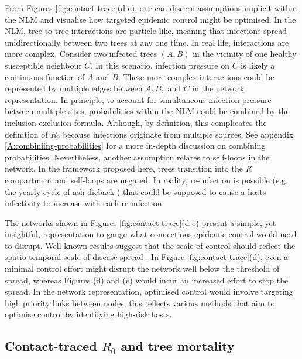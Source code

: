 From Figures \ref{fig:contact-trace}(d-e), one can discern assumptions implicit within the NLM and visualise how targeted epidemic control might be optimised.
In the NLM, tree-to-tree interactions are particle-like, meaning that infections spread unidirectionally between two trees at any one time.
In real life, interactions are more complex.
Consider two infected trees $(A, B)$ in the vicinity of one healthy susceptible neighbour $C$. In this scenario, infection pressure on $C$ is likely a continuous function of $A$ and $B$.
These more complex interactions could be represented by multiple edges between $A, B,$ and $C$ in the network representation.
In principle, to account for simultaneous infection pressure between multiple sites, probabilities within the NLM could be combined by the inclusion-exclusion formula.
Although, by definition, this complicates the definition of $R_0$ because infections originate from multiple sources.
See appendix \ref{A:combiniing-probabilities} for a more in-depth discussion on combining probabilities.
Nevertheless, another assumption relates to self-loops in the network.
In the framework proposed here, trees transition into the $R$ compartment and self-loops are negated.
In reality, re-infection is possible (e.g. the yearly cycle of ash dieback \cite{gross2014h}) that could be supposed to cause a hosts infectivity to increase with each re-infection.

The networks shown in Figures \ref{fig:contact-trace}(d-e) present a simple, yet insightful, representation to gauge what connections epidemic control would need to disrupt.
Well-known results suggest that the scale of control should reflect the spatio-temporal scale of disease spread \cite{control-scale-matching}.
In Figure \ref{fig:contact-trace}(d), even a minimal control effort might disrupt the network well below the threshold of spread,
whereas Figures (d) and (e) would incur an increased effort to stop the spread.
In the network representation, optimised control would involve targeting high priority links between nodes;
this reflects various methods that aim to optimise control by identifying high-risk hosts.


\subsection{Contact-traced $R_0$ and tree mortality}

